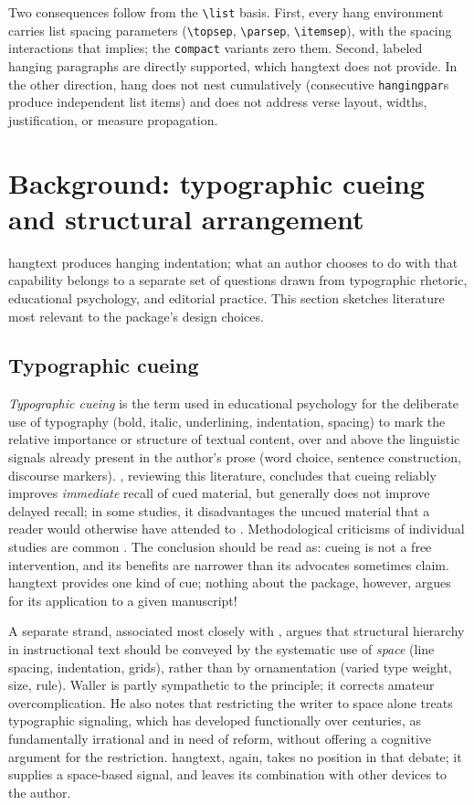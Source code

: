 \documentclass[11pt, twoside, openany]{article}
\newcommand{\pkg}[1]{\textsf{#1}}
\newcommand{\env}[1]{\texttt{#1}}
\newcommand{\cs}[1]{\texttt{\textbackslash #1}}
\begin{document}
Two consequences follow from the \cs{list} basis. First, every \pkg{hang} environment carries list spacing parameters (\cs{topsep}, \cs{parsep}, \cs{itemsep}), with the spacing interactions that implies; the \env{compact} variants zero them. Second, labeled hanging paragraphs are directly supported, which \pkg{hangtext} does not provide. In the other direction, \pkg{hang} does not nest cumulatively (consecutive \env{hangingpar}s produce independent list items) and does not address verse layout, widths, justification, or measure propagation.

\section{Background: typographic cueing and structural arrangement}\label{sec:background}

\pkg{hangtext} produces hanging indentation; what an author chooses to do with that capability belongs to a separate set of questions drawn from typographic rhetoric, educational psychology, and editorial practice. This section sketches literature most relevant to the package's design choices.

\subsection{Typographic cueing}\label{subsec:cueing}

\emph{Typographic cueing} is the term used in educational psychology for the deliberate use of typography (bold, italic, underlining, indentation, spacing) to mark the relative importance or structure of textual content, over and above the linguistic signals already present in the author's prose (word choice, sentence construction, discourse markers). \cite{waller1987}, reviewing this literature, concludes that cueing reliably improves \emph{immediate} recall of cued material, but generally does not improve delayed recall; in some studies, it disadvantages the uncued material that a reader would otherwise have attended to \cite{glynndivesta1979}. Methodological criticisms of individual studies are common \cite{hartleybartlettbranthwaite1980}. The conclusion should be read as: cueing is not a free intervention, and its benefits are narrower than its advocates sometimes claim. \pkg{hangtext} provides one kind of cue; nothing about the package, however, argues for its application to a given manuscript!

A separate strand, associated most closely with \cite{hartleyburnhill1977}, argues that structural hierarchy in instructional text should be conveyed by the systematic use of \emph{space} (line spacing, indentation, grids), rather than by ornamentation (varied type weight, size, rule). Waller is partly sympathetic to the principle; it corrects amateur overcomplication. He also notes that restricting the writer to space alone treats typographic signaling, which has developed functionally over centuries, as fundamentally irrational and in need of reform, without offering a cognitive argument for the restriction. \pkg{hangtext}, again, takes no position in that debate; it supplies a space-based signal, and leaves its combination with other devices to the author.
\end{document}
